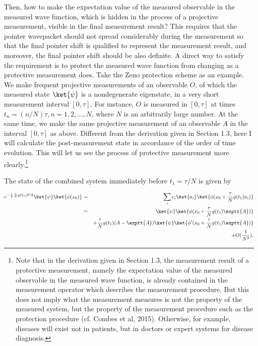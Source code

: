 Then, how to make the expectation value of the measured observable  in the measured wave function, which is hidden in the process of a projective measurement, visible in the final measurement result?  %
This requires that the pointer wavepacket should not spread considerably during the measurement so that the final pointer shift is qualified to represent the measurement result, and moreover, the final pointer shift should be also definite. 
A direct way to satisfy the requirement is to protect the measured wave function from changing as a protective measurement does. Take the Zeno protection scheme as an example. 
We make frequent projective measurements of an observable $O$, of which the measured state $\ket{\psi}$ is a nondegenerate eigenstate, in a very short measurement interval $[0,\tau]$. For instance, $O$ is measured in $[0,\tau]$ at times $t_n=(n/N)\tau, n = 1,2, . . . ,N$, where $N$ is an arbitrarily large number.  At the same time, we make the same projective measurement of an observable $A$ in the interval $[0,\tau]$ as above. Different from the derivation given in Section 1.3, here I will calculate the post-measurement state in accordance of the order of time evolution. This will let us see the process of protective measurement more clearly.\footnote{Note that in the derivation given in Section 1.3, the measurement result of a protective measurement, namely the expectation value of the measured observable in the measured wave function, is already contained in the measurement operator which describes the measurement procedure. But this does not imply what the measurement measures is not the property of the measured system, but the property of the measurement procedure such as the protection procedure (cf. Combes et al, 2015).  Otherwise, for example, diseases will exist not in patients, but in doctors or expert systems for disease diagnosis.}  

The state of the combined system immediately before $t_1=\tau/N$ is given by

\begin{eqnarray}
  e^{-{i\over\hbar}{\tau\over N}g(t_1)P A}\ket{\psi}\ket{\phi(x_0)} &=& \sum_{i} c_i \ket{a_i} \ket{\phi(x_0+{\tau\over N}g(t_1)a_i)}\nonumber \\
 &=& \ket{\psi}\ket{\phi(x_0+ {\tau\over N}g(t_1)\exptt{A})} \nonumber \\ 
& & +{\tau\over N}g(t_1)(A-\exptt{A}) \ket{\psi} \ket{\phi'(x_0+{\tau\over N}g(t_1)\exptt{A})}\nonumber \\ & & + O({1 \over N^2}),
\label{}
\end{eqnarray}

